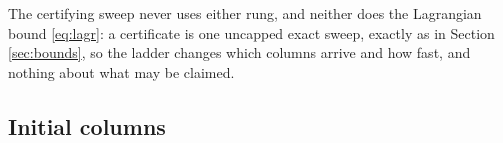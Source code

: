 The certifying sweep never uses either rung, and neither does the
Lagrangian bound \eqref{eq:lagr}: a certificate is one uncapped exact
sweep, exactly as in Section \ref{sec:bounds}, so the ladder changes
which columns arrive and how fast, and nothing about what may be
claimed.



\subsection{Initial columns}
\label{sec:initcols}

